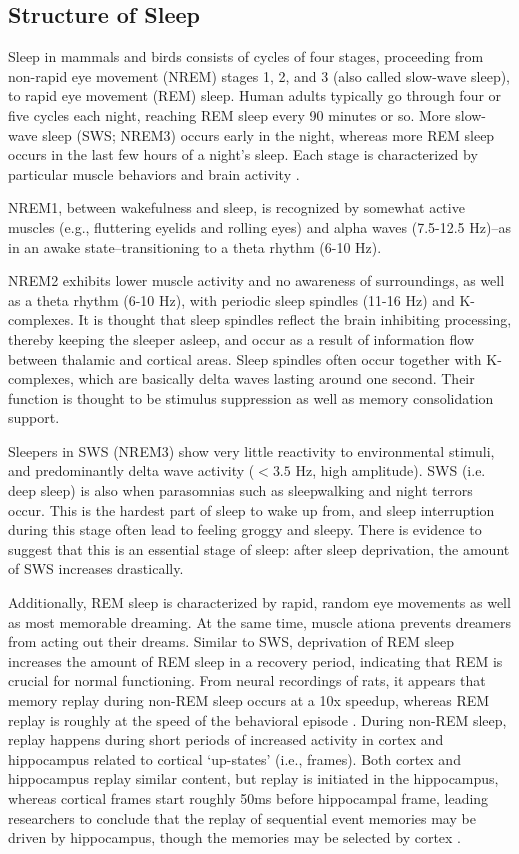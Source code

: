 \documentclass[10pt,letterpaper]{article}
\begin{document}
\subsection{Structure of Sleep}

Sleep in mammals and birds consists of cycles of four stages, proceeding from non-rapid eye movement (NREM) stages 1, 2, and 3 (also called slow-wave sleep), to rapid eye movement (REM) sleep. Human adults typically go through four or five cycles each night, reaching REM sleep every 90 minutes or so. More slow-wave sleep (SWS; NREM3) occurs early in the night, whereas more REM sleep occurs in the last few hours of a night's sleep. Each stage is characterized by particular muscle behaviors and brain activity \cite{Schulz:2008}. 

NREM1, between wakefulness and sleep, is recognized by somewhat active muscles (e.g., fluttering eyelids and rolling eyes) and alpha waves (7.5-12.5 Hz)--as in an awake state--transitioning to a theta rhythm (6-10 Hz). 

NREM2 exhibits lower muscle activity and no awareness of surroundings, as well as a theta rhythm (6-10 Hz), with periodic sleep spindles (11-16 Hz) and K-complexes. It is thought that sleep spindles reflect the brain inhibiting processing, thereby keeping the sleeper asleep, and occur as a result of information flow between thalamic and cortical areas. Sleep spindles often occur together with K-complexes, which are basically delta waves lasting around one second. Their function is thought to be stimulus suppression as well as memory consolidation support.

Sleepers in SWS (NREM3) show very little reactivity to environmental stimuli, and predominantly delta wave activity ($<3.5$ Hz, high amplitude). SWS (i.e. deep sleep) is also when parasomnias such as sleepwalking and night terrors occur. This is the hardest part of sleep to wake up from, and sleep interruption during this stage often lead to feeling groggy and sleepy. There is evidence to suggest that this is an essential stage of sleep: after sleep deprivation, the amount of SWS increases drastically.

Additionally, REM sleep is characterized by rapid, random eye movements as well as most memorable dreaming. At the same time, muscle ationa prevents dreamers from acting out their dreams. Similar to SWS, deprivation of REM sleep increases the amount of REM sleep in a recovery period, indicating that REM is crucial for normal functioning. From neural recordings of rats, it appears that memory replay during non-REM sleep occurs at a 10x speedup, whereas REM replay is roughly at the speed of the behavioral episode \cite{Bendor:2012}. During non-REM sleep, replay happens during short periods of increased activity in cortex and hippocampus related to cortical `up-states' (i.e., frames). Both cortex and hippocampus replay similar content, but replay is initiated in the hippocampus, whereas cortical frames start roughly 50ms before hippocampal frame, leading researchers to conclude that the replay of sequential event memories may be driven by hippocampus, though the memories may be selected by cortex \cite{Lee:2002}.
\end{document}
